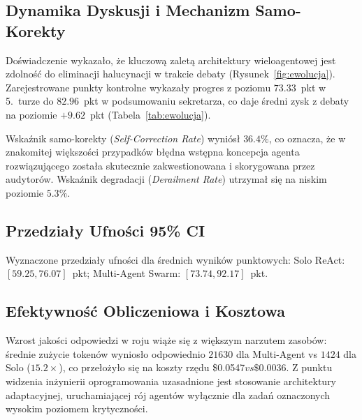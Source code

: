 \subsection{Dynamika Dyskusji i Mechanizm Samo-Korekty}
Doświadczenie wykazało, że kluczową zaletą architektury wieloagentowej jest zdolność do eliminacji halucynacji w trakcie debaty (Rysunek~\ref{fig:ewolucja}).
Zarejestrowane punkty kontrolne wykazały progres z poziomu $73.33$~pkt w 5.~turze do $82.96$~pkt w podsumowaniu sekretarza,
co daje średni zysk z debaty na poziomie $+9.62$~pkt (Tabela~\ref{tab:ewolucja}).

Wskaźnik samo-korekty (\textit{Self-Correction Rate}) wyniósł $36.4\%$, co oznacza, że w znakomitej większości przypadków błędna wstępna koncepcja agenta rozwiązującego
została skutecznie zakwestionowana i skorygowana przez audytorów. Wskaźnik degradacji (\textit{Derailment Rate}) utrzymał się na niskim poziomie $5.3\%$.

\subsection{Przedziały Ufności 95\% CI}
Wyznaczone przedziały ufności dla średnich wyników punktowych:
Solo ReAct: $[59.25, 76.07]$~pkt; Multi-Agent Swarm: $[73.74, 92.17]$~pkt.

\subsection{Efektywność Obliczeniowa i Kosztowa}
Wzrost jakości odpowiedzi w roju wiąże się z większym narzutem zasobów:
średnie zużycie tokenów wyniosło odpowiednio $21630$ dla Multi-Agent vs $1424$ dla Solo ($15.2\times$),
co przełożyło się na koszty rzędu \$0.0547$ vs \$0.0036$.
Z punktu widzenia inżynierii oprogramowania uzasadnione jest stosowanie architektury adaptacyjnej, uruchamiającej rój agentów wyłącznie dla zadań oznaczonych wysokim poziomem krytyczności.
